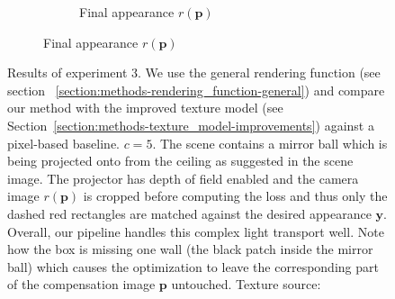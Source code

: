 \begin{figure}[]
\begin{subfigure}{\textwidth}
\begin{subfigure}{0.19\textwidth}
            \caption*{Final appearance \(r(\bm{p})\)}
        \end{subfigure}
    \end{subfigure}
    \caption{Results of experiment 3. We use the general rendering function (see section ~\ref{section:methods-rendering_function-general}) and compare our method with the improved texture model (see Section~\ref{section:methods-texture_model-improvements}) against a pixel-based baseline. \(c = 5\). The scene contains a mirror ball which is being projected onto from the ceiling as suggested in the scene image. The projector has depth of field enabled and the camera image \(r(\bm{p})\) is cropped before computing the loss and thus only the dashed red rectangles are matched against the desired appearance \(\bm{y}\). Overall, our pipeline handles this complex light transport well. Note how the box is missing one wall (the black patch inside the mirror ball) which causes the optimization to leave the corresponding part of the compensation image \(\bm{p}\) untouched. Texture source: \citet{Pixar128}}
    \label{fig:ex03-ball_dof}
\end{figure}


